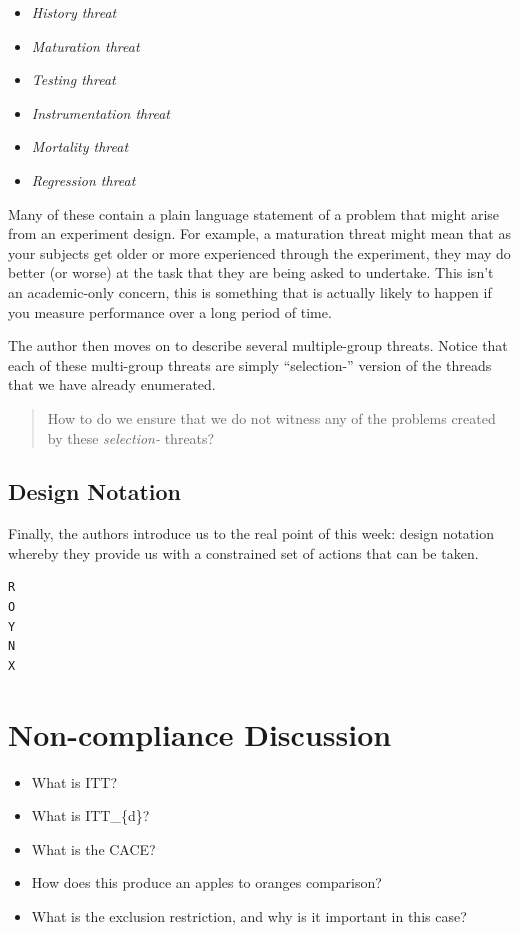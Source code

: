 \documentclass[
]{book}
\providecommand{\tightlist}{%
  \setlength{\itemsep}{0pt}\setlength{\parskip}{0pt}}
\begin{document}
\begin{itemize}
\tightlist
\item
  \emph{History threat}
\item
  \emph{Maturation threat}
\item
  \emph{Testing threat}
\item
  \emph{Instrumentation threat}
\item
  \emph{Mortality threat}
\item
  \emph{Regression threat}
\end{itemize}

Many of these contain a plain language statement of a problem that might
arise from an experiment design. For example, a maturation threat might
mean that as your subjects get older or more experienced through the
experiment, they may do better (or worse) at the task that they are
being asked to undertake. This isn't an academic-only concern, this is
something that is actually likely to happen if you measure performance
over a long period of time.

The author then moves on to describe several multiple-group threats.
Notice that each of these multi-group threats are simply ``selection-''
version of the threads that we have already enumerated.

\begin{quote}
How to do we ensure that we do not witness any of the problems created
by these \emph{selection-} threats?
\end{quote}

\hypertarget{design-notation-1}{%
\subsection{Design Notation}\label{design-notation-1}}

Finally, the authors introduce us to the real point of this week: design
notation whereby they provide us with a constrained set of actions that
can be taken.

\begin{verbatim}
R
O 
Y 
N 
X 
\end{verbatim}

\hypertarget{non-compliance-discussion}{%
\section{Non-compliance Discussion}\label{non-compliance-discussion}}

\begin{itemize}
\tightlist
\item
  What is ITT?
\item
  What is ITT\_\{d\}?
\item
  What is the CACE?
\item
  How does this produce an apples to oranges comparison?
\item
  What is the exclusion restriction, and why is it important in this
  case?
\end{itemize}
\end{document}
